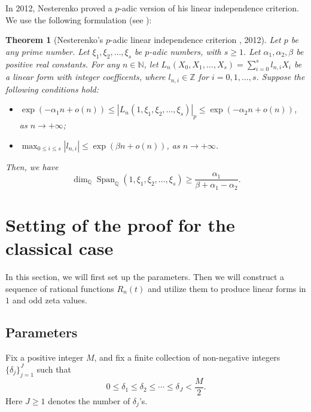 \documentclass[12pt]{article}
\newtheorem{theorem}{Theorem}[section]
\numberwithin{equation}{section}
\begin{document}
\medskip

In 2012, Nesterenko \cite{Nes2012} proved a $p$-adic version of his linear independence criterion. We use the following formulation (see \cite[Theorem 1.4]{Spr20}):

\begin{theorem}[Nesterenko's $p$-adic linear independence criterion \cite{Nes2012}, 2012]\label{Nes_p}
Let $p$ be any prime number. Let $\xi_1,\xi_2,\ldots,\xi_s$ be $p$-adic numbers, with $s \geqslant 1$. Let $\alpha_1, \alpha_2, \beta$ be positive real constants. For any $n \in \mathbb{N}$, let $L_n(X_0,X_1,\ldots,X_s) = \sum_{i=0}^{s} l_{n,i}X_i$ be a linear form with integer coefficents, where $l_{n,i} \in \mathbb{Z}$ for $i=0,1,\ldots,s$. Suppose the following conditions hold:
\begin{itemize}
	\item $\exp\left( -\alpha_1 n + o(n)  \right) \leqslant |L_n(1,\xi_1,\xi_2,\ldots,\xi_s)|_p \leqslant \exp\left( -\alpha_2 n + o(n)  \right)$, as $n \to +\infty$;
	\item $\max_{0\leqslant i \leqslant s} |l_{n,i}| \leqslant \exp\left( \beta n + o(n) \right)$, as $n \to +\infty$.
\end{itemize}
Then, we have 
\[ \dim_{\mathbb{Q}}\operatorname{Span}_{\mathbb{Q}}\left( 1,\xi_1,\xi_2,\ldots,\xi_s \right) \geqslant \frac{\alpha_1}{\beta+\alpha_1-\alpha_2}. \]
\end{theorem}

\bigskip

\section{Setting of the proof for the classical case}\label{Sect_sett}

In this section, we will first set up the parameters. Then we will construct a sequence of rational functions $R_n(t)$ and utilize them to produce linear forms in $1$ and odd zeta values. 

\subsection{Parameters}

Fix a positive integer $M$, and fix a finite collection of non-negative integers $\{\delta_j\}_{j=1}^{J}$ such that
\begin{equation*}\label{condition_on_deltas}
	0 \leqslant \delta_1 \leqslant \delta_2 \leqslant \cdots \leqslant \delta_J < \frac{M}{2}.
\end{equation*}
Here $J \geqslant 1$ denotes the number of $\delta_j$'s. 
\end{document}
